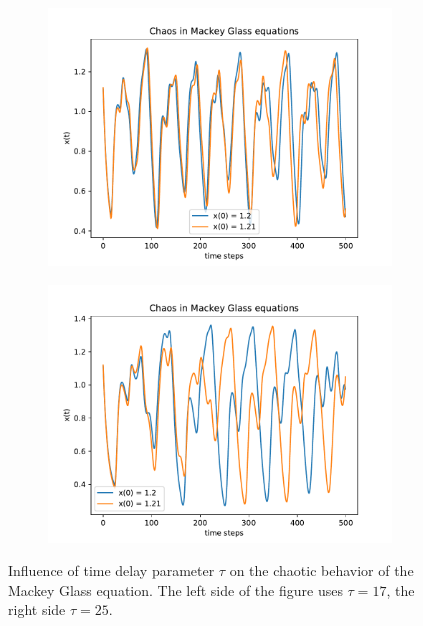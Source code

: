 \documentclass{article}
\begin{document}
\begin{figure}
  \centering
  \begin{subfigure}{.5\textwidth}
    \centering
    \includegraphics[width=\linewidth]{figures/mg_chaos_17.pdf}
  \end{subfigure}
  \hspace{-6mm}
  \begin{subfigure}{.5\textwidth}
    \centering
    \includegraphics[width=\linewidth]{figures/mg_chaos_25.pdf}
  \end{subfigure}
  \caption{Influence of time delay parameter $\tau$ on the chaotic behavior of
    the Mackey Glass equation. The left side of the figure uses $\tau = 17$,
    the right side $\tau = 25$.}
  \label{fig:mackey_chaos}
\end{figure}
\end{document}
